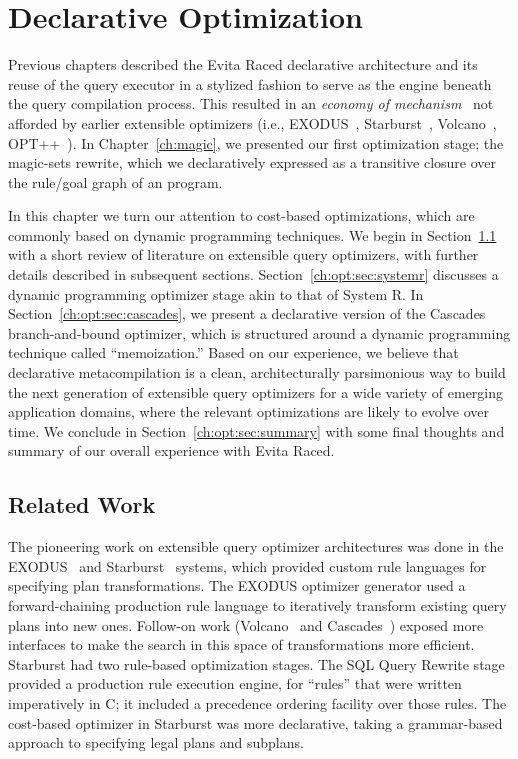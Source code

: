 \chapter[Declarative Optimization]{Declarative Optimization}
\label{ch:opt}

Previous chapters described the Evita Raced declarative architecture and its
reuse of the query executor in a stylized fashion to serve as the engine
beneath the query compilation process.  This resulted in an {\em economy of
mechanism}~\cite{Saltzer75theprotection} not afforded by earlier extensible
optimizers (i.e., EXODUS~\cite{exodus}, Starburst~\cite{phh92},
Volcano~\cite{volcano}, OPT++~\cite{opt++}).  In Chapter~\ref{ch:magic}, we
presented our first optimization stage; the magic-sets rewrite, which we
declaratively expressed as a transitive closure over the rule/goal graph of an
\OVERLOG program.

In this chapter we turn our attention to cost-based optimizations, which are
commonly based on dynamic programming techniques.  We begin in
Section~\ref{ch:opt:sec:related} with a short review of literature on
extensible query optimizers, with further details described in subsequent
sections.  Section~\ref{ch:opt:sec:systemr} discusses a dynamic programming
optimizer stage akin to that of System R.  In
Section~\ref{ch:opt:sec:cascades}, we present a declarative version of the
Cascades branch-and-bound optimizer, which is structured around a dynamic
programming technique called ``memoization.'' Based on our experience, we
believe that declarative metacompilation is a clean, architecturally
parsimonious way to build the next generation of extensible query optimizers
for a wide variety of emerging application domains, where the relevant
optimizations are likely to evolve over time.  We conclude in
Section~\ref{ch:opt:sec:summary} with some final thoughts and summary of our
overall experience with Evita Raced.

\section{Related Work}
\label{ch:opt:sec:related}

The pioneering work on extensible query optimizer architectures was done in the
EXODUS~\cite{exodus} and Starburst~\cite{lohman,phh92} systems, which provided
custom rule languages for specifying plan transformations.  The EXODUS
optimizer generator used a forward-chaining production rule language to iteratively
transform existing query plans into new ones.  Follow-on work
(Volcano~\cite{volcano} and Cascades~\cite{cascades}) exposed more interfaces
to make the search in this space of transformations more efficient.  Starburst
had two rule-based optimization stages.  The SQL Query Rewrite stage provided a
production rule execution engine, for ``rules'' that were written imperatively
in C; it included a precedence ordering facility over those rules.  The
cost-based optimizer in Starburst was more declarative, taking a grammar-based
approach to specifying legal plans and subplans.


